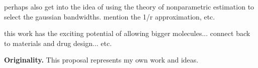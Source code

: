 \documentclass[twoside,leqno, 12pt]{article}
\begin{document}
perhaps also get into the idea of using the theory of nonparametric
estimation to select the gaussian bandwidths.  mention the 1/r
approximation, etc. %

this work has the exciting potential of allowing bigger molecules...
connect back to materials and drug design... etc.


\textbf{Originality.}  This proposal represents my own work and ideas.





\end{document}
